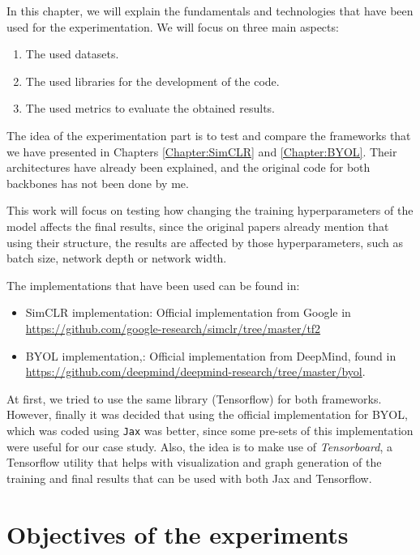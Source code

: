 In this chapter, we will explain the fundamentals and technologies that have been used for the experimentation. We will focus on three main aspects:
\begin{enumerate}
\item The used datasets.
\item The used libraries for the development of the code.
\item The used metrics to evaluate the obtained results.
\end{enumerate}

The idea of the experimentation part is to test and compare the frameworks that we have presented in Chapters \ref{Chapter:SimCLR} and \ref{Chapter:BYOL}. Their architectures have already been explained, and the original code for both backbones has not been done by me. 

This work will focus on testing how changing the training hyperparameters of the model affects the final results, since the original papers \cite{chen_simple_2020,grill2020bootstrap} already mention that using their structure, the results are affected by those hyperparameters, such as batch size, network depth or network width.

The implementations that have been used can be found in:
\begin{itemize}
\item SimCLR implementation: Official implementation from Google in \url{https://github.com/google-research/simclr/tree/master/tf2}

\item BYOL implementation,: Official implementation from DeepMind, found in \url{https://github.com/deepmind/deepmind-research/tree/master/byol}. 
\end{itemize}


At first, we tried to use the same library (Tensorflow) for both frameworks. However, finally it was decided that using the official implementation for BYOL, which was coded using \lstinline{Jax} was better, since some pre-sets of this implementation were useful for our case study. Also, the idea is to make use of \emph{Tensorboard}, a Tensorflow utility that helps with visualization and graph generation of the training and final results that can be used with both Jax and Tensorflow.

\section{Objectives of the experiments}

